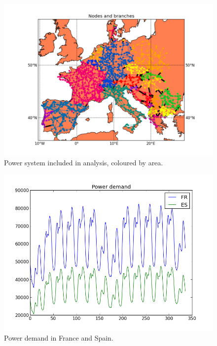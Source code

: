 \documentclass{article}
\begin{document}
\begin{figure}
\centering
\includegraphics[scale=0.6]{example_2w_map_areas.png}
\caption{Power system included in analysis, coloured by area.}
\label{fig:example_map_areas}
\end{figure}

\begin{figure}
\centering
\includegraphics[scale=0.6]{example_2w_demand.png}
\caption{Power demand in France and Spain.}
\label{fig:example_demandl}
\end{figure}
\end{document}
